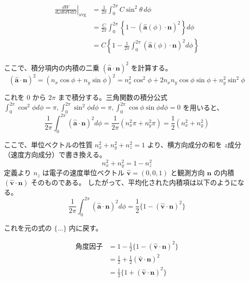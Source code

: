 \documentclass[a4paper,11pt]{bxjsarticle} %
\begin{document}
\begin{align}
    \left. \frac{d W}{d\omega dt dV d\Omega} \right|_{\text{avg}} &= \frac{1}{2\pi} \int_0^{2\pi} C \sin^2\theta \, d\phi \\
    &= \frac{C}{2\pi} \int_0^{2\pi} \left\{ 1 - (\hat{\bm{a}}(\phi) \cdot \bm{n})^2 \right\} d\phi \\
    &= C \left\{ 1 - \frac{1}{2\pi} \int_0^{2\pi} (\hat{\bm{a}}(\phi) \cdot \bm{n})^2 d\phi \right\}
\end{align}

ここで、積分項内の内積の二乗 $(\hat{\bm{a}} \cdot \bm{n})^2$ を計算する。
\begin{equation}
    (\hat{\bm{a}} \cdot \bm{n})^2 = (n_x \cos\phi + n_y \sin\phi)^2 = n_x^2 \cos^2\phi + 2 n_x n_y \cos\phi \sin\phi + n_y^2 \sin^2\phi
\end{equation}

これを $0$ から $2\pi$ まで積分する。三角関数の積分公式 $\int_0^{2\pi} \cos^2\phi d\phi = \pi, \int_0^{2\pi} \sin^2\phi d\phi = \pi, \int_0^{2\pi} \cos\phi \sin\phi d\phi = 0$ を用いると、
\begin{equation}
    \frac{1}{2\pi} \int_0^{2\pi} (\hat{\bm{a}} \cdot \bm{n})^2 d\phi = \frac{1}{2\pi} (n_x^2 \pi + n_y^2 \pi) = \frac{1}{2} (n_x^2 + n_y^2)
\end{equation}

ここで、単位ベクトルの性質 $n_x^2 + n_y^2 + n_z^2 = 1$ より、横方向成分の和を $z$成分（速度方向成分）で書き換える。
\begin{equation}
    n_x^2 + n_y^2 = 1 - n_z^2
\end{equation}
定義より $n_z$ は電子の速度単位ベクトル $\hat{\bm{v}} = (0,0,1)$ と観測方向 $\bm{n}$ の内積 $(\hat{\bm{v}} \cdot \bm{n})$ そのものである。
したがって、平均化された内積項は以下のようになる。
\begin{equation}
    \frac{1}{2\pi} \int_0^{2\pi} (\hat{\bm{a}} \cdot \bm{n})^2 d\phi = \frac{1}{2} \{ 1 - (\hat{\bm{v}} \cdot \bm{n})^2 \}
\end{equation}

これを元の式の $\{\dots\}$ 内に戻す。

\begin{align}
    \text{角度因子} &= 1 - \frac{1}{2} \{ 1 - (\hat{\bm{v}} \cdot \bm{n})^2 \} \\
    &= \frac{1}{2} + \frac{1}{2} (\hat{\bm{v}} \cdot \bm{n})^2 \\
    &= \frac{1}{2} \{ 1 + (\hat{\bm{v}} \cdot \bm{n})^2 \}
\end{align}
\end{document}
